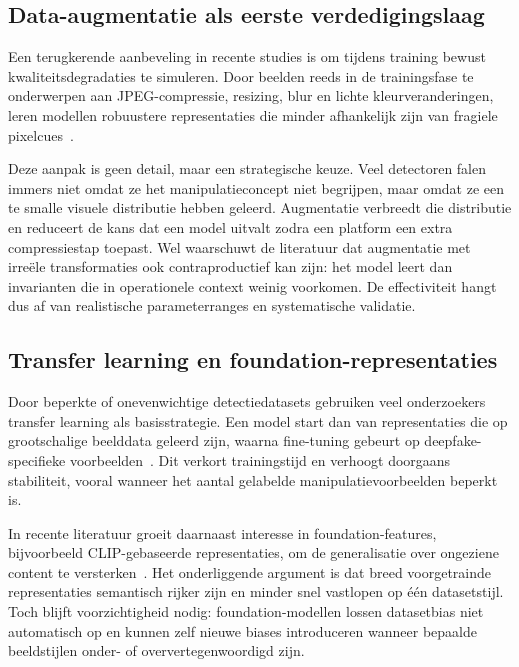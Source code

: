 \subsection{Data-augmentatie als eerste verdedigingslaag}
Een terugkerende aanbeveling in recente studies is om tijdens training bewust kwaliteitsdegradaties te simuleren. Door beelden reeds in de trainingsfase te onderwerpen aan JPEG-compressie, resizing, blur en lichte kleurveranderingen, leren modellen robuustere representaties die minder afhankelijk zijn van fragiele pixelcues~\autocite{CompressionHybrid2025,EvaluationModels2025}. 

Deze aanpak is geen detail, maar een strategische keuze. Veel detectoren falen immers niet omdat ze het manipulatieconcept niet begrijpen, maar omdat ze een te smalle visuele distributie hebben geleerd. Augmentatie verbreedt die distributie en reduceert de kans dat een model uitvalt zodra een platform een extra compressiestap toepast. Wel waarschuwt de literatuur dat augmentatie met irreële transformaties ook contraproductief kan zijn: het model leert dan invarianten die in operationele context weinig voorkomen. De effectiviteit hangt dus af van realistische parameterranges en systematische validatie.

\subsection{Transfer learning en foundation-representaties}
Door beperkte of onevenwichtige detectiedatasets gebruiken veel onderzoekers transfer learning als basisstrategie. Een model start dan van representaties die op grootschalige beelddata geleerd zijn, waarna fine-tuning gebeurt op deepfake-specifieke voorbeelden~\autocite{Raza2026}. Dit verkort trainingstijd en verhoogt doorgaans stabiliteit, vooral wanneer het aantal gelabelde manipulatievoorbeelden beperkt is.

In recente literatuur groeit daarnaast interesse in foundation-features, bijvoorbeeld CLIP-gebaseerde representaties, om de generalisatie over ongeziene content te versterken~\autocite{CLIPDeepfake2025}. Het onderliggende argument is dat breed voorgetrainde representaties semantisch rijker zijn en minder snel vastlopen op één datasetstijl. Toch blijft voorzichtigheid nodig: foundation-modellen lossen datasetbias niet automatisch op en kunnen zelf nieuwe biases introduceren wanneer bepaalde beeldstijlen onder- of oververtegenwoordigd zijn.


